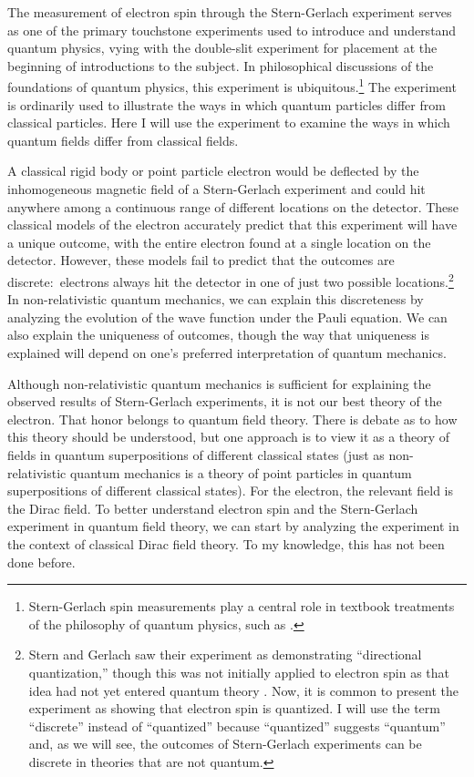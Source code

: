 \documentclass[12pt,secnumarabic,amsmath,amssymb,balancelastpage,nofootinbib]{article}
\begin{document}
The measurement of electron spin through the Stern-Gerlach experiment serves as one of the primary touchstone experiments used to introduce and understand quantum physics, vying with the double-slit experiment for placement at the beginning of introductions to the subject.  In philosophical discussions of the foundations of quantum physics, this experiment is ubiquitous.\footnote{Stern-Gerlach spin measurements play a central role in textbook treatments of the philosophy of quantum physics, such as \citet{albertQM, lewisQM, norsen2017, maudlinQM, barrettQM}.\label{textbooks}}  The experiment is ordinarily used to illustrate the ways in which quantum particles differ from classical particles.  Here I will use the experiment to examine the ways in which quantum fields differ from classical fields.

A classical rigid body or point particle electron would be deflected by the inhomogeneous magnetic field of a Stern-Gerlach experiment and could hit anywhere among a continuous range of different locations on the detector.  These classical models of the electron accurately predict that this experiment will have a unique outcome, with the entire electron found at a single location on the detector.  However, these models fail to predict that the outcomes are discrete:\ electrons always hit the detector in one of just two possible locations.\footnote{Stern and Gerlach saw their experiment as demonstrating ``directional quantization,'' though this was not initially applied to electron spin as that idea had not yet entered quantum theory \citep{sterngerlach1922, weinert1995, sauer2016, schmidt2016}.  Now, it is common to present the experiment as showing that electron spin is quantized.  I will use the term ``discrete'' instead of ``quantized'' because ``quantized'' suggests ``quantum'' and, as we will see, the outcomes of Stern-Gerlach experiments can be discrete in theories that are not quantum.}  In non-relativistic quantum mechanics, we can explain this discreteness by analyzing the evolution of the wave function under the Pauli equation.  We can also explain the uniqueness of outcomes, though the way that uniqueness is explained will depend on one's preferred interpretation of quantum mechanics.

Although non-relativistic quantum mechanics is sufficient for explaining the observed results of Stern-Gerlach experiments, it is not our best theory of the electron.  That honor belongs to quantum field theory.  There is debate as to how this theory should be understood, but one approach is to view it as a theory of fields in quantum superpositions of different classical states (just as non-relativistic quantum mechanics is a theory of point particles in quantum superpositions of different classical states).  For the electron, the relevant field is the Dirac field.  To better understand electron spin and the Stern-Gerlach experiment in quantum field theory, we can start by analyzing the experiment in the context of classical Dirac field theory.  To my knowledge, this has not been done before.
\end{document}
